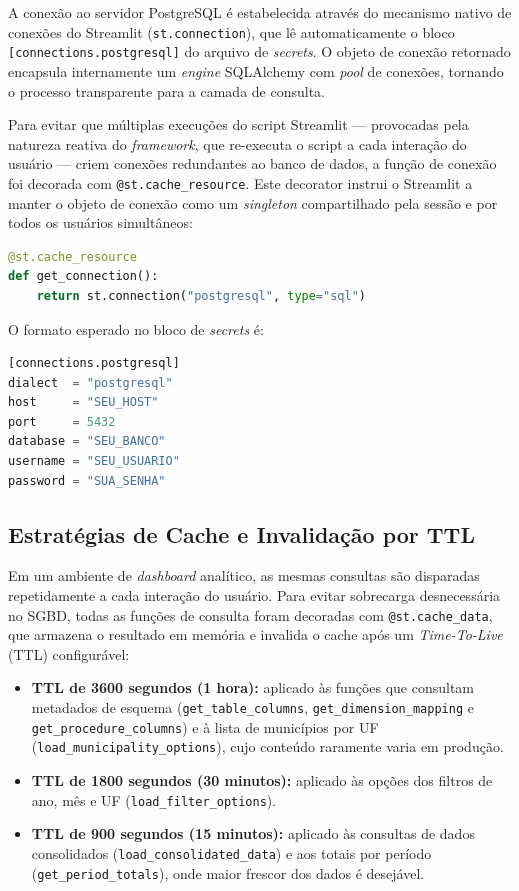 \documentclass[12pt,a4paper]{report}
\begin{document}
A conexão ao servidor PostgreSQL é estabelecida através do mecanismo nativo de
conexões do Streamlit (\texttt{st.connection}), que lê automaticamente o bloco
\texttt{[connections.postgresql]} do arquivo de \textit{secrets}. O objeto de
conexão retornado encapsula internamente um \textit{engine} SQLAlchemy com
\textit{pool} de conexões, tornando o processo transparente para a camada de consulta.

Para evitar que múltiplas execuções do script Streamlit — provocadas pela natureza
reativa do \textit{framework}, que re-executa o script a cada interação do usuário
— criem conexões redundantes ao banco de dados, a função de conexão foi decorada com
\texttt{@st.cache\_resource}. Este decorator instrui o Streamlit a manter o objeto de
conexão como um \textit{singleton} compartilhado pela sessão e por todos os usuários
simultâneos:

\begin{lstlisting}[language=Python]
@st.cache_resource
def get_connection():
    return st.connection("postgresql", type="sql")
\end{lstlisting}

O formato esperado no bloco de \textit{secrets} é:

\begin{lstlisting}[language=Python, numbers=none]
[connections.postgresql]
dialect  = "postgresql"
host     = "SEU_HOST"
port     = 5432
database = "SEU_BANCO"
username = "SEU_USUARIO"
password = "SUA_SENHA"
\end{lstlisting}

\subsection{Estratégias de Cache e Invalidação por TTL}

Em um ambiente de \textit{dashboard} analítico, as mesmas consultas são disparadas
repetidamente a cada interação do usuário. Para evitar sobrecarga desnecessária no
SGBD, todas as funções de consulta foram decoradas com \texttt{@st.cache\_data}, que
armazena o resultado em memória e invalida o cache após um \textit{Time-To-Live} (TTL)
configurável:

\begin{itemize}
    \item \textbf{TTL de 3600 segundos (1 hora):} aplicado às funções que consultam
    metadados de esquema (\texttt{get\_table\_columns}, \texttt{get\_dimension\_mapping}
    e \texttt{get\_procedure\_columns}) e à lista de municípios por UF
    (\texttt{load\_municipality\_options}), cujo conteúdo raramente varia em produção.
    \item \textbf{TTL de 1800 segundos (30 minutos):} aplicado às opções dos filtros de
    ano, mês e UF (\texttt{load\_filter\_options}).
    \item \textbf{TTL de 900 segundos (15 minutos):} aplicado às consultas de dados
    consolidados (\texttt{load\_consolidated\_data}) e aos totais por período
    (\texttt{get\_period\_totals}), onde maior frescor dos dados é desejável.
\end{itemize}
\end{document}
